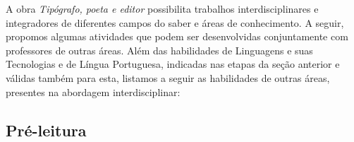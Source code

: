 \documentclass[12pt]{extarticle}
\begin{document}

A obra \emph{Tipógrafo, poeta e editor} possibilita trabalhos
interdisciplinares e integradores de diferentes campos do saber e áreas
de conhecimento. A seguir, propomos algumas atividades que podem ser
desenvolvidas conjuntamente com professores de outras áreas. Além das
habilidades de Linguagens e suas Tecnologias e de Língua Portuguesa,
indicadas nas etapas da seção anterior e válidas também para esta,
listamos a seguir as habilidades de outras áreas, presentes na abordagem
interdisciplinar:

\subsection{Pré-leitura}

\end{document}
